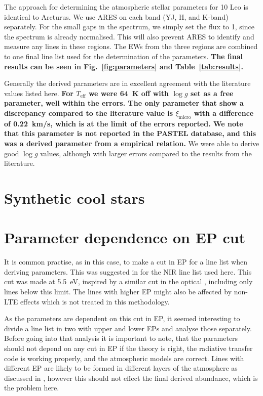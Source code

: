 The approach for determining the atmospheric stellar parameters for 10 Leo is
identical to Arcturus. We use ARES on each band (YJ, H, and K-band) separately.
For the small gaps in the spectrum, we simply set the flux to 1, since the
spectrum is already normalised. This will also prevent ARES to identify and
measure any lines in these regions. The EWs from the three regions are combined
to one final line list used for the determination of the parameters. {\bf The
final results can be seen in Fig.~\ref{fig:parameters} and
Table~\ref{tab:results}.}

Generally the derived parameters are in excellent agreement with the literature
values listed here. {\bf For $T_\mathrm{eff}$ we were \SI{64}{K} off with $\log
g$ set as a free parameter, well within the errors. The only parameter that show
a discrepancy compared to the literature value is $\xi_\mathrm{micro}$ with a
difference of \SI{0.22}{km/s}, which is at the limit of the errors reported. We
note that this parameter is not reported in the PASTEL database, and this was a
derived parameter from a empirical relation.} We were able to derive good $\log
g$ values, although with larger errors compared to the results from the
literature.


\section{Synthetic cool stars}
\label{sec:synthetic_spectra}



\section{Parameter dependence on EP cut}
\label{sec:EPcut}

It is common practise, as in this case, to make a cut in EP for a line list when deriving
parameters. This was suggested in \citet{Andreasen2016} \citep[later done in][]{Andreasen2017b} for
the NIR line list used here. This cut was made at \SI{5.5}{eV}, inspired by a similar cut in the
optical \citep{Sousa2008a}, including only lines below this limit. The lines with higher EP might
also be affected by non-LTE effects which is not treated in this methodology.

As the parameters are dependent on this cut in EP, it
seemed interesting to divide a line list in two with upper and lower EPs and analyse those
separately. Before going into that analysis it is important to note, that the parameters should not
depend on any cut in EP if the theory is right, the radiative transfer code is working properly, and
the atmospheric models are correct. Lines with different EP are likely to be formed in different
layers of the atmosphere as discussed in , however this should not
effect the final derived abundance, which is the problem here.
